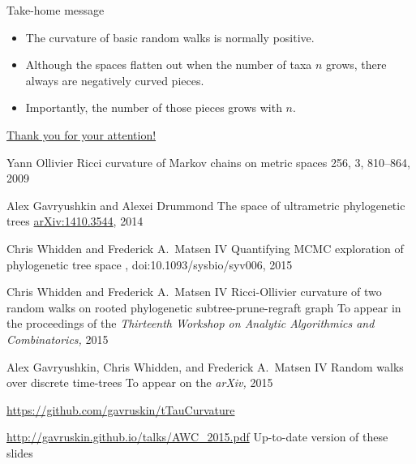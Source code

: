 \documentclass{beamer}
\theoremstyle{example}
\begin{document}
\begin{frame}{Take-home message}
\begin{block}{}
\begin{itemize}
\item The curvature of basic random walks is normally positive.
\item Although the spaces flatten out when the number of taxa $n$ grows, there always are negatively curved pieces.
\item Importantly, the number of those pieces grows with $n$.
\end{itemize}
\end{block}
\end{frame}

\begin{frame}{\href{http://alex.gavruskin.com/pictures/}{\Large{Thank
you for your attention!}}}


\scriptsize

Yann Ollivier
\newblock Ricci curvature of Markov chains on metric spaces
 256, 3, 810--864, 2009

Alex Gavryushkin and Alexei Drummond
\newblock The space of ultrametric phylogenetic trees
 \href{http://arxiv.org/abs/1410.3544}{arXiv:1410.3544}, 2014

Chris Whidden and Frederick A.\ Matsen IV
\newblock Quantifying MCMC exploration of phylogenetic tree space
, doi:10.1093/sysbio/syv006, 2015

Chris Whidden and Frederick A.\ Matsen IV
\newblock Ricci-Ollivier curvature of two random walks on rooted phylogenetic subtree-prune-regraft graph
\newblock To appear in the proceedings of the {\em Thirteenth Workshop on Analytic Algorithmics and Combinatorics,} 2015

Alex Gavryushkin, Chris Whidden, and Frederick A.\ Matsen IV
\newblock Random walks over discrete time-trees
\newblock To appear on the {\em arXiv,} 2015

\url{https://github.com/gavruskin/tTauCurvature}

\url{http://gavruskin.github.io/talks/AWC_2015.pdf}
\newblock Up-to-date version of these slides

\end{frame}
\end{document}
